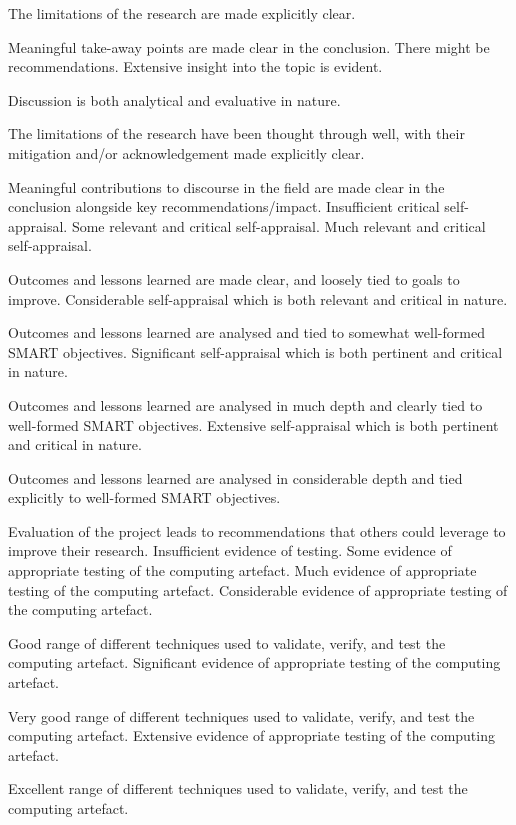 \begin{markingrubric}
        \par		The limitations of the research are made explicitly clear.
        \par		Meaningful take-away points are made clear in the conclusion. There might be recommendations.
        \grade		Extensive insight into the topic is evident.
        \par		Discussion is both analytical and evaluative in nature.
        \par		The limitations of the research have been thought through well, with their mitigation and/or acknowledgement made explicitly clear.
        \par		Meaningful contributions to discourse in the field are made clear in the conclusion alongside key recommendations/impact.       
%
        \grade\fail  	Insufficient critical self-appraisal.
        \grade		Some relevant and critical self-appraisal.
        \grade		Much relevant and critical self-appraisal.
        \par		Outcomes and lessons learned are made clear, and loosely tied to goals to improve.
        \grade		Considerable self-appraisal which is both relevant and critical in nature.
        \par		Outcomes and lessons learned are analysed and tied to somewhat well-formed SMART objectives.
        \grade		Significant self-appraisal which is both pertinent and critical in nature.
        \par		Outcomes and lessons learned are analysed in much depth and clearly tied to well-formed SMART objectives.
        \grade		Extensive self-appraisal which is both pertinent and critical in nature.
        \par		Outcomes and lessons learned are analysed in considerable depth and tied explicitly to well-formed SMART objectives. 
       \par		Evaluation of the project leads to recommendations that others could leverage to improve their research. 
%
        \grade\fail       Insufficient evidence of testing.
        \grade		Some evidence of appropriate testing of the computing artefact.
        \grade		Much evidence of appropriate testing of the computing artefact.
        \grade		Considerable evidence of appropriate testing of the computing artefact.
        \par		Good range of different techniques used to validate, verify, and test the computing artefact.
        \grade		Significant evidence of appropriate testing of the computing artefact.
        \par		Very good range of different techniques used to validate, verify, and test the computing artefact.
        \grade		Extensive evidence of appropriate testing of the computing artefact.
        \par		Excellent range of different techniques used to validate, verify, and test the computing artefact.
\end{markingrubric}
